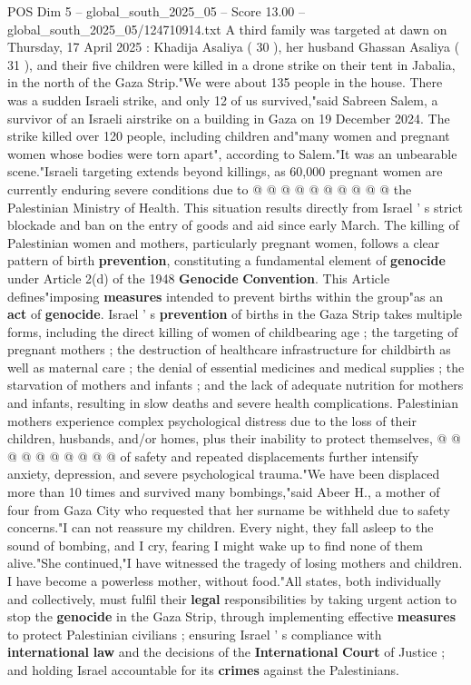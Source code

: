 \begin{textsample}{POS Dim 5 – global\_south\_2025\_05 – Score 13.00 – global\_south\_2025\_05/124710914.txt}
A third family was targeted at dawn on Thursday, 17 April 2025 : Khadija Asaliya ( 30 ), her husband Ghassan Asaliya ( 31 ), and their five children were killed in a drone strike on their tent in Jabalia, in the north of the Gaza Strip."We were about 135 people in the house.
There was a sudden Israeli strike, and only 12 of us survived,"said Sabreen Salem, a survivor of an Israeli airstrike on a building in Gaza on 19 December 2024.
The strike killed over 120 people, including children and"many women and pregnant women whose bodies were torn apart", according to Salem."It was an unbearable scene."Israeli targeting extends beyond killings, as 60,000 pregnant women are currently enduring severe conditions due to @ @ @ @ @ @ @ @ @ @ the Palestinian Ministry of Health.
This situation results directly from Israel ' s strict blockade and ban on the entry of goods and aid since early March.
The killing of Palestinian women and mothers, particularly pregnant women, follows a clear pattern of birth \textbf{prevention}, constituting a fundamental element of \textbf{genocide} under Article 2(d) of the 1948 \textbf{Genocide} \textbf{Convention}.
This Article defines"imposing \textbf{measures} intended to prevent births within the group"as an \textbf{act} of \textbf{genocide}.
Israel ' s \textbf{prevention} of births in the Gaza Strip takes multiple forms, including the direct killing of women of childbearing age ; the targeting of pregnant mothers ; the destruction of healthcare infrastructure for childbirth as well as maternal care ; the denial of essential medicines and medical supplies ; the starvation of mothers and infants ; and the lack of adequate nutrition for mothers and infants, resulting in slow deaths and severe health complications.
Palestinian mothers experience complex psychological distress due to the loss of their children, husbands, and/or homes, plus their inability to protect themselves, @ @ @ @ @ @ @ @ @ @ of safety and repeated displacements further intensify anxiety, depression, and severe psychological trauma."We have been displaced more than 10 times and survived many bombings,"said Abeer H., a mother of four from Gaza City who requested that her surname be withheld due to safety concerns."I can not reassure my children.
Every night, they fall asleep to the sound of bombing, and I cry, fearing I might wake up to find none of them alive."She continued,"I have witnessed the tragedy of losing mothers and children.
I have become a powerless mother, without food."All states, both individually and collectively, must fulfil their \textbf{legal} responsibilities by taking urgent action to stop the \textbf{genocide} in the Gaza Strip, through implementing effective \textbf{measures} to protect Palestinian civilians ; ensuring Israel ' s compliance with \textbf{international} \textbf{law} and the decisions of the \textbf{International} \textbf{Court} of Justice ; and holding Israel accountable for its \textbf{crimes} against the Palestinians.

\end{textsample}
